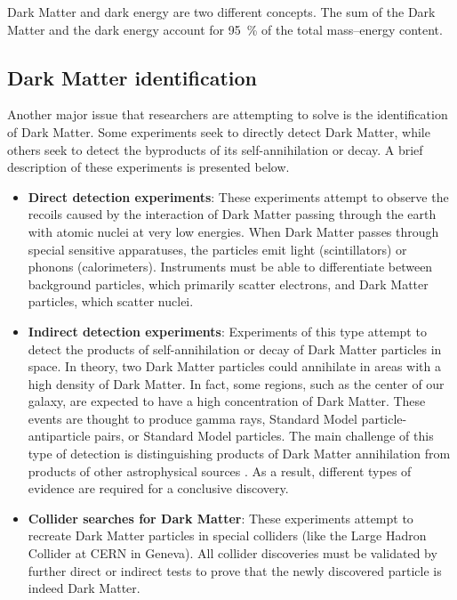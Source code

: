 Dark Matter and dark energy are two different concepts. The sum of the Dark Matter and the dark energy account for \SI{95}{\percent} of the total mass–energy content.


\subsection*{Dark Matter identification}
Another major issue that researchers are attempting to solve is the identification of Dark Matter. Some experiments seek to directly detect Dark Matter, while others seek to detect the byproducts of its self-annihilation or decay. \cite{feng_2010_dark} A brief description of these experiments is presented below.

\begin{itemize}
    \itemsep0em
    \item \textbf{Direct detection experiments}: These experiments attempt to observe the recoils caused by the interaction of Dark Matter passing through the earth with atomic nuclei at very low energies. When Dark Matter passes through special sensitive apparatuses, the particles emit light (scintillators) or phonons (calorimeters). Instruments must be able to differentiate between background particles, which primarily scatter electrons, and Dark Matter particles, which scatter nuclei.
    \item \textbf{Indirect detection experiments}: Experiments of this type attempt to detect the products of self-annihilation or decay of Dark Matter particles in space. In theory, two Dark Matter particles could annihilate in areas with a high density of Dark Matter. In fact, some regions, such as the center of our galaxy, are expected to have a high concentration of Dark Matter. These events are thought to produce gamma rays, Standard Model particle-antiparticle pairs, or Standard Model particles. The main challenge of this type of detection is distinguishing products of Dark Matter annihilation from products of other astrophysical sources \cite{doetinchem_2020_cosmicray}. As a result, different types of evidence are required for a conclusive discovery.
    \item \textbf{Collider searches for Dark Matter}: These experiments attempt to recreate Dark Matter particles in special colliders (like the Large Hadron Collider at CERN in Geneva). All collider discoveries must be validated by further direct or indirect tests to prove that the newly discovered particle is indeed Dark Matter.
\end{itemize}

